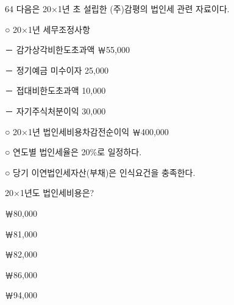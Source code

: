 \begin{question}{64}
다음은 20×1년 초 설립한 (주)감평의 법인세 관련 자료이다.
\begin{framedtext}
○ 20×1년 세무조정사항 \par
\hspace{1em}－ 감가상각비한도초과액 \hfill ￦55,000 \par
\hspace{1em}－ 정기예금 미수이자 \hfill 25,000 \par
\hspace{1em}－ 접대비한도초과액 \hfill 10,000 \par
\hspace{1em}－ 자기주식처분이익 \hfill 30,000 \par
○ 20×1년 법인세비용차감전순이익 \hfill ￦400,000 \par
○ 연도별 법인세율은 20\%로 일정하다. \par
○ 당기 이연법인세자산(부채)은 인식요건을 충족한다. \par
\end{framedtext}
20×1년도 법인세비용은?
\begin{choices}
  \item ￦80,000
  \item ￦81,000
  \item ￦82,000
  \item ￦86,000
  \item ￦94,000
\end{choices}
\end{question}
